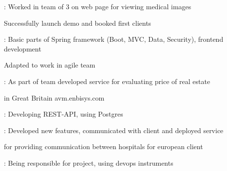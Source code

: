\documentclass[]{cv-style}
\begin{document}
    {\large{ }}
    {\par}
    \vspace{0.2cm}
    {}
    {\par}
    \hspace*{0.7cm} {}: Worked in team of 3 on web page for viewing medical images
    {\par}
    \hspace*{0.7cm} Successfully launch demo and booked first clients
    {\par}
    \hspace*{0.7cm} {}: Basic parts of Spring framework (Boot, MVC, Data, Security), frontend development
    {\par}
    \hspace*{0.7cm} Adapted to work in agile team
    {\par}
    \vspace{0.1cm}
    {}
    {\par}
    \hspace*{0.7cm} {}: As part of team developed service for evaluating price of real estate
    {\par}
    \hspace*{0.7cm} in Great Britain avm.enbisys.com
    {\par}
    \hspace*{0.7cm} {}: Developing REST-API, using Postgres
    {\par}
    \vspace{0.1cm}
    {}
    {\par}
    \hspace*{0.7cm} {}: Developed new features, communicated with client and deployed service
    {\par}
    \hspace*{0.7cm} for providing communication between hospitals for european client
    {\par}
    \hspace*{0.7cm} {}: Being responsible for project, using devops instruments
    {\par}
    \vspace{0.3cm}

    \vspace{1cm}

\end{document}
